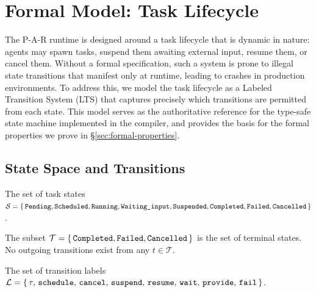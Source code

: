 \section{Formal Model: Task Lifecycle}\label{sec:formal-model}

The P-A-R runtime is designed around a task lifecycle that is dynamic in nature: agents may spawn tasks, suspend them awaiting external input, resume them, or cancel them. Without a formal specification, such a system is prone to illegal state transitions that manifest only at runtime, leading to crashes in production environments. To address this, we model the task lifecycle as a Labeled Transition System (LTS) that captures precisely which transitions are permitted from each state. This model serves as the authoritative reference for the type-safe state machine implemented in the compiler, and provides the basis for the formal properties we prove in \S\ref{sec:formal-properties}.

\subsection{State Space and Transitions}\label{sec:lts-definition}

\begin{definition}\label{def:states}
The set of task states $\mathcal{S} = \{\,\identifiable{Pending}, \identifiable{Scheduled}, \identifiable{Running}, \identifiable{Waiting\_input}, \identifiable{Suspended}, \identifiable{Completed}, \identifiable{Failed}, \identifiable{Cancelled}\,\}$.
\end{definition}

\begin{definition}\label{def:terminal-states}
The subset $\mathcal{T} = \{\,\identifiable{Completed}, \identifiable{Failed}, \identifiable{Cancelled}\,\}$ is the set of terminal states. No outgoing transitions exist from any $t \in \mathcal{T}$.
\end{definition}

\begin{definition}\label{def:labels}
The set of transition labels $\mathcal{L} = \{\,\tau,\, \identifiable{schedule},\, \identifiable{cancel},\, \identifiable{suspend},\, \identifiable{resume},\, \identifiable{wait},\, \identifiable{provide},\, \identifiable{fail}\,\}$.
\end{definition}

